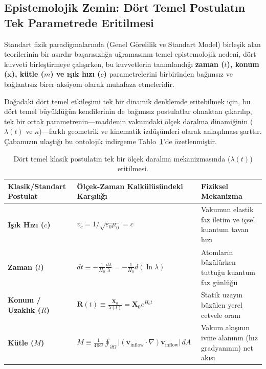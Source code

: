 \subsection{Epistemolojik Zemin: Dört Temel Postulatın Tek Parametrede Eritilmesi}
\label{sec:postulatlarin_eritilmesi_sentez}

Standart fizik paradigmalarında (Genel Görelilik ve Standart Model) birleşik alan teorilerinin bir asırdır başarısızlığa uğramasının temel epistemolojik nedeni, dört kuvveti birleştirmeye çalışırken, bu kuvvetlerin tanımlandığı \textbf{zaman ($t$), konum ($\mathbf{x}$), kütle ($m$) ve ışık hızı ($c$)} parametrelerini birbirinden bağımsız ve bağlantısız birer aksiyom olarak muhafaza etmeleridir.

Doğadaki dört temel etkileşimi tek bir dinamik denklemde eritebilmek için, bu dört temel büyüklüğün kendilerinin de bağımsız postulatlar olmaktan çıkarılıp, tek bir ortak parametrenin—maddenin vakumdaki ölçek daralma dinamiğinin ($\lambda(t)$ ve $\kappa$)—farklı geometrik ve kinematik izdüşümleri olarak anlaşılması şarttır. Çabamızın ulaştığı bu ontolojik indirgeme Tablo~\ref{tab:ontolojik_indirgeme_sentez}'de özetlenmiştir.

\begin{table}[h!]
    \centering
    \small
    \begin{tabular}{@{}lll@{}}
        \toprule
        \textbf{Klasik/Standart Postulat} & \textbf{Ölçek-Zaman Kalkülüsündeki Karşılığı}                                                                                     & \textbf{Fiziksel Mekanizma}                              \\ \midrule
        \textbf{Işık Hızı ($c$)}          & $v_c = 1/\sqrt{\varepsilon_0\mu_0} = c$                                                                                           & Vakumun elastik faz iletim ve içsel kuantum tavan hızı   \\
        \textbf{Zaman ($t$)}              & $dt \equiv -\frac{1}{H_0} \frac{d\lambda}{\lambda} = -\frac{1}{H_0} d(\ln\lambda)$                                                & Atomların büzülürken tuttuğu kuantum faz günlüğü         \\
        \textbf{Konum / Uzaklık ($R$)}    & $\mathbf{R}(t) \equiv \frac{\mathbf{X}_0}{\lambda(t)} = \mathbf{X}_0 e^{H_0 t}$                                                   & Statik uzayın büzülen yerel cetvele oranı                \\
        \textbf{Kütle ($M$)}              & $M \equiv \frac{1}{4\pi G} \oint_{\partial \Omega} |(\mathbf{v}_{\mathrm{inflow}}\cdot\nabla)\mathbf{v}_{\mathrm{inflow}}| \, dA$ & Vakum akışının ivme alanının (hız gradyanının) net akısı \\ \bottomrule
    \end{tabular}
    \caption{Dört temel klasik postulatın tek bir ölçek daralma mekanizmasında ($\lambda(t)$) eritilmesi.}
    \label{tab:ontolojik_indirgeme_sentez}
\end{table}

